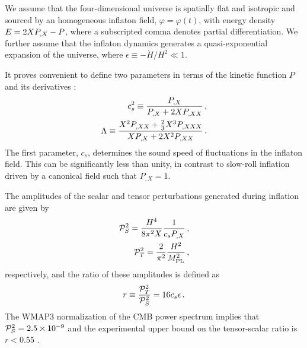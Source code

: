We assume that the four-dimensional universe is   
spatially flat and isotropic and sourced by an  
homogeneous inflaton field, $\varphi =\varphi (t)$, with energy 
density $E = 2XP_{,X} - P$, where a subscripted comma denotes partial
differentiation. 
We further assume that the inflaton dynamics  
generates a quasi-exponential expansion of the universe, 
where $\epsilon \equiv -\dot{H}/H^2 \ll1$. 

 
It proves convenient to define two parameters in terms of the 
kinetic  function $P$ and its derivatives \cite{lidser1,lidser3}: 
% 
\begin{eqnarray}
\label{eq:defcs-dbiintro}
 c_s^2 \equiv \frac{P_{,X}}{P_{,X} + 2X P_{,XX}} \,,
\\
\label{eq:deflambda-dbiintro}
\Lambda \equiv  \frac{X^2 P_{,XX} +
\frac{2}{3}X^3 P_{,XXX}}{X P_{,X} +
2X^2 P_{,XX}}\,.
\end{eqnarray}
% 
The first parameter, $c_s$, determines the sound speed of fluctuations 
in the inflaton field. This can be significantly less than unity, 
in contrast to slow-roll inflation driven by a canonical 
field such that $P_{,X} =1$.


The amplitudes of the scalar and tensor perturbations 
generated during inflation are given by \cite{gm}
% 
\begin{eqnarray} 
\label{eq:Ps-dbiintro}
 \mathcal{P}_S^2 = \frac{H^4}{8\pi^2 X}\frac{1}{c_s P_{,X}} \,,
\\
\label{eq:Pt-dbiintro}
\mathcal{P}_T^2 = \frac{2}{\pi^2} \frac{H^2}{M_{\mathrm{PL}}^2} \,,
\end{eqnarray}
% 
respectively, and the ratio of these amplitudes 
is defined as \cite{gm} 
% 
\begin{equation}
\label{eq:rdefn-dbiintro}
r\equiv \frac{\mathcal{P}_T^2}{\mathcal{P}_S^2} = 16c_s \epsilon \,.
\end{equation}
%   
The WMAP3 normalization of the CMB power spectrum 
implies that $\mathcal{P}_S^2= 2.5\times10^{-9}$ and 
the experimental upper bound on the tensor-scalar 
ratio is $r <0.55$ \cite{spergel}.


